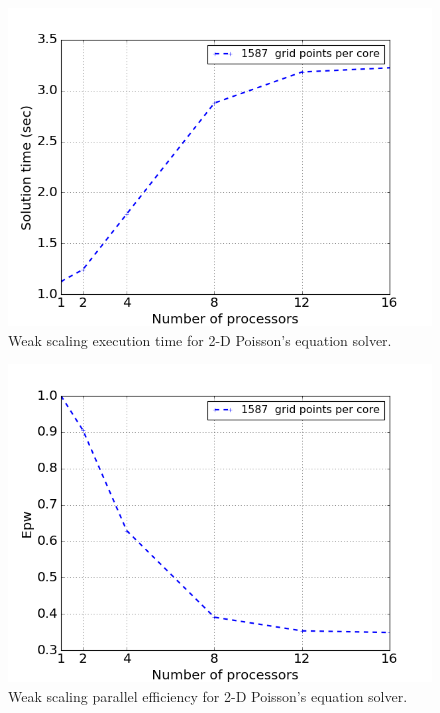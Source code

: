 \documentclass{anstrans}
\begin{document}
\begin{figure}[htp!]
  \centering
  \includegraphics[width=\linewidth]{lapl_weak_time.png}
  \caption{Weak scaling execution time  for 2-D Poisson's equation solver.}
  \label{fig:lapl_weak_time}
\end{figure}
\FloatBarrier

\begin{figure}[htpb!]
  \centering
  \includegraphics[width=\linewidth]{lapl_weak_eff.png}
  \caption{Weak scaling parallel efficiency for 2-D Poisson's equation solver.}
  \label{fig:lapl_weak_eff}
\end{figure}
\end{document}
